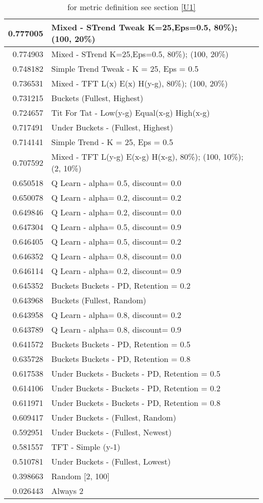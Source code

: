 \begin{table}[!hbtp]
\begin{footnotesize}
\begin{tabular}{|r|l|}
0.777005 & Mixed - {STrend Tweak K=25,Eps=0.5, 80\%); (100, 20\%)}\\ \hline
0.774903 & Mixed - {STrend K=25,Eps=0.5, 80\%); (100, 20\%)}\\ \hline
0.748182 & Simple Trend Tweak - K = 25, Eps = 0.5\\ \hline
0.736531 & Mixed - {TFT L(x) E(x) H(y-g), 80\%); (100, 20\%)}\\ \hline
0.731215 & Buckets (Fullest, Highest)\\ \hline
0.724657 & Tit For Tat - Low(y-g) Equal(x-g) High(x-g)\\ \hline
0.717491 & Under Buckets - (Fullest, Highest)\\ \hline
0.714141 & Simple Trend - K = 25, Eps = 0.5\\ \hline
0.707592 & Mixed - {TFT L(y-g) E(x-g) H(x-g), 80\%); (100, 10\%); (2, 10\%)}\\ \hline
0.650518 & Q Learn - alpha= 0.5, discount= 0.0\\ \hline
0.650078 & Q Learn - alpha= 0.2, discount= 0.2\\ \hline
0.649846 & Q Learn - alpha= 0.2, discount= 0.0\\ \hline
0.647304 & Q Learn - alpha= 0.5, discount= 0.9\\ \hline
0.646405 & Q Learn - alpha= 0.5, discount= 0.2\\ \hline
0.646352 & Q Learn - alpha= 0.8, discount= 0.0\\ \hline
0.646114 & Q Learn - alpha= 0.2, discount= 0.9\\ \hline
0.645352 & Buckets Buckets - PD, Retention = 0.2\\ \hline
0.643968 & Buckets (Fullest, Random)\\ \hline
0.643958 & Q Learn - alpha= 0.8, discount= 0.2\\ \hline
0.643789 & Q Learn - alpha= 0.8, discount= 0.9\\ \hline
0.641572 & Buckets Buckets - PD, Retention = 0.5\\ \hline
0.635728 & Buckets Buckets - PD, Retention = 0.8\\ \hline
0.617538 & Under Buckets - Buckets - PD, Retention = 0.5\\ \hline
0.614106 & Under Buckets - Buckets - PD, Retention = 0.2\\ \hline
0.611971 & Under Buckets - Buckets - PD, Retention = 0.8\\ \hline
0.609417 & Under Buckets - (Fullest, Random)\\ \hline
0.592951 & Under Buckets - (Fullest, Newest)\\ \hline
0.581557 & TFT - Simple (y-1)\\ \hline
0.510781 & Under Buckets - (Fullest, Lowest)\\ \hline
0.398663 & Random [2, 100]\\ \hline
0.026443 & Always 2\\ \hline
\end{tabular}
\caption{for metric definition see section \eqref{U1}}
\end{footnotesize}
\end{table}

